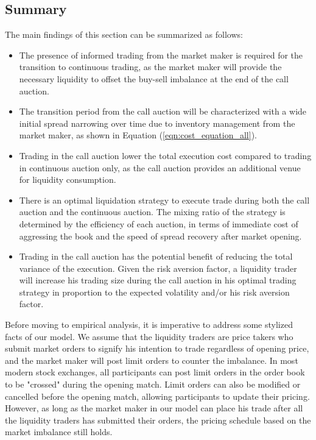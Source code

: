 \subsection{Summary}

The main findings of this section can be summarized as follows:

\begin{itemize}
  \item The presence of informed trading from the market maker is required for the transition to continuous trading, as the market maker will provide the necessary liquidity to offset the buy-sell imbalance at the end of the call auction.
  \item The transition period from the call auction will be characterized with a wide initial spread narrowing over time due to inventory management from the market maker, as shown in Equation (\ref{eqn:cost_equation_all}).
  \item Trading in the call auction lower the total execution cost compared to trading in continuous auction only, as the call auction provides an additional venue for liquidity consumption.
  \item There is an optimal liquidation strategy to execute trade during both the call auction and the continuous auction. The mixing ratio of the strategy is determined by the efficiency of each auction, in terms of immediate cost of aggressing the book and the speed of spread recovery after market opening.
  \item {\color{red}Trading in the call auction has the potential benefit of reducing the total variance of the execution. Given the risk aversion factor, a liquidity trader will increase his trading size during the call auction in his optimal trading strategy in proportion to the expected volatility and/or his risk aversion factor.}
\end{itemize}

Before moving to empirical analysis, it is imperative to address some stylized facts of our model. We assume that the liquidity traders are price takers who submit market orders to signify his intention to trade regardless of opening price, and the market maker will post limit orders to counter the imbalance. In most modern stock exchanges, all participants can post limit orders in the order book to be "crossed" during the opening match. Limit orders can also be modified or cancelled before the opening match, allowing participants to update their pricing. However, as long as the market maker in our model can place his trade after all the liquidity traders has submitted their orders, the pricing schedule based on the market imbalance still holds.

